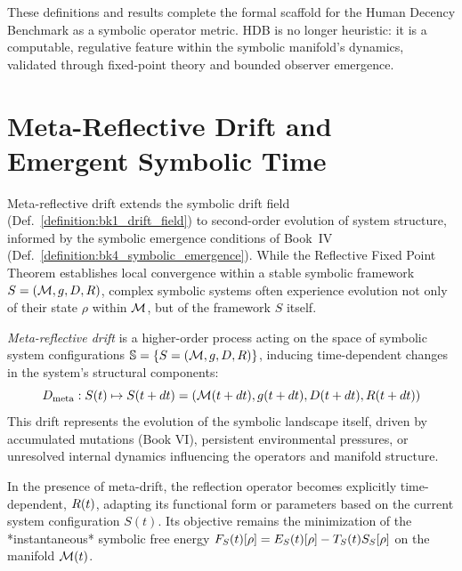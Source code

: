 \begin{remark}
\label{remark:bk7_hdb_closure}
These definitions and results complete the formal scaffold for the Human Decency Benchmark as a symbolic operator metric. HDB is no longer heuristic: it is a computable, regulative feature within the symbolic manifold's dynamics, validated through fixed-point theory and bounded observer emergence.
\end{remark}

\section{Meta-Reflective Drift and Emergent Symbolic Time}
\label{sec:bk7_meta_reflective_drift_and_emergent_symbolic_time}

Meta-reflective drift extends the symbolic drift field (Def.~\ref{definition:bk1_drift_field}) to second-order evolution of system structure, informed by the symbolic emergence conditions of Book~IV (Def.~\ref{definition:bk4_symbolic_emergence}).
While the Reflective Fixed Point Theorem establishes local convergence within a stable symbolic framework \(S = (\mathcal{M}, g, D, R)\), complex symbolic systems often experience evolution not only of their state \(\rho\) within \(\mathcal{M}\), but of the framework \(S\) itself.
\begin{definition}
\label{definition:bk7_meta_reflective_drift__meta}
\emph{Meta-reflective drift} is a higher-order process acting on the space of symbolic system configurations \(\mathbb{S} = \{ S = (\mathcal{M}, g, D, R) \}\), inducing time-dependent changes in the system's structural components:
\[
D_{\mathrm{meta}} : S(t) \mapsto S(t+dt) = (\mathcal{M}(t+dt), g(t+dt), D(t+dt), R(t+dt))
\]
This drift represents the evolution of the symbolic landscape itself, driven by accumulated mutations (Book VI), persistent environmental pressures, or unresolved internal dynamics influencing the operators and manifold structure.
\end{definition}
\begin{definition}
\label{definition:bk7_adaptive_reflection_operator_t}
In the presence of meta-drift, the reflection operator becomes explicitly time-dependent, \(R(t)\), adapting its functional form or parameters based on the current system configuration \(S(t)\). Its objective remains the minimization of the *instantaneous* symbolic free energy \(F_S(t)[\rho] = E_S(t)[\rho] - T_S(t) S_S[\rho]\) on the manifold \(\mathcal{M}(t)\).
\end{definition}
